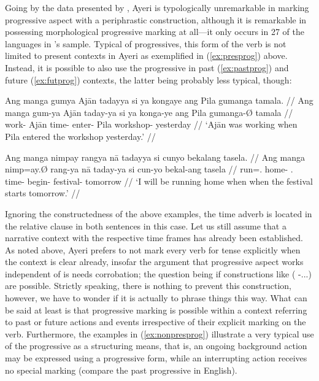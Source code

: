 Going by the data presented by \citet[91]{dahl1985}, Ayeri is typologically 
unremarkable in marking progressive aspect with a periphrastic construction, 
although it is remarkable in possessing morphological progressive marking at 
all---it only occurs in 27\pct{} of the languages in \citeauthor{dahl1985}'s 
sample. Typical of progressives, this form of the verb is not limited to 
present contexts in Ayeri as exemplified in (\ref{ex:presprog}) above. Instead, 
it is possible to also use the progressive in past (\ref{ex:pastprog}) and 
future (\ref{ex:futprog}) contexts, the latter being probably less typical, 
though:

\pex\label{ex:nonpresprog}
\a\label{ex:pastprog}\begingl
	\gla Ang manga gumya {} Ajān tadayya si ya kongaye ang Pila gumanga 
		tamala. //
	\glb Ang manga gum-ya {} Ajān taday-ya si ya konga-ye ang Pila 
		gumanga-Ø tamala //
	\glc \AgtT{} \Prog{} work-\Tsg{} \Top{} Ajān time-\Loc{} \Rel{} \LocT{} 
		enter-\TsgF{} \Aarg{} Pila workshop-\Top{} yesterday //
	\glft `Ajān was working when Pila entered the workshop yesterday.' //
\endgl

\a\label{ex:futprog}\begingl
	\gla Ang manga nimpay rangya nā tadayya si cunyo bekalang tasela. //
	\glb Ang manga nimp=ay.Ø rang-ya nā taday-ya si cun-yo bekal-ang 
		tasela //
	\glc \AgtT{} \Prog{} run=\Fsg{}.\Top{} home-\Loc{} \Fsg{}.\Gen{} 
		time-\Loc{} \Rel{} begin-\TsgN{} festival-\Aarg{} tomorrow //
	\glft `I will be running home when when the festival starts 
		tomorrow.' //
\endgl

\xe

Ignoring the constructedness of the above examples, the time adverb is located 
in the relative clause in both sentences in this case. Let us still assume that 
a narrative context with the respective time frames has already been 
established. As noted above, Ayeri prefers to not mark every verb for tense 
explicitly when the context is clear already, insofar the argument that 
progressive aspect works independent of  is needs corrobation; the 
question being if constructions like  (\Prog{} 
\Pst{}-...) are possible. Strictly speaking, there is nothing to prevent this 
construction, however, we have to wonder if it is actually  to 
phrase things this way. What can be said at least is that progressive marking 
is possible within a context referring to past or future actions and events 
irrespective of their explicit marking on the verb. Furthermore, the examples 
in (\ref{ex:nonpresprog}) illustrate a very typical use of the progressive as a 
structuring means, that is, an ongoing background action may be expressed using 
a progressive form, while an interrupting action receives no special marking 
(compare the past progressive in English).

